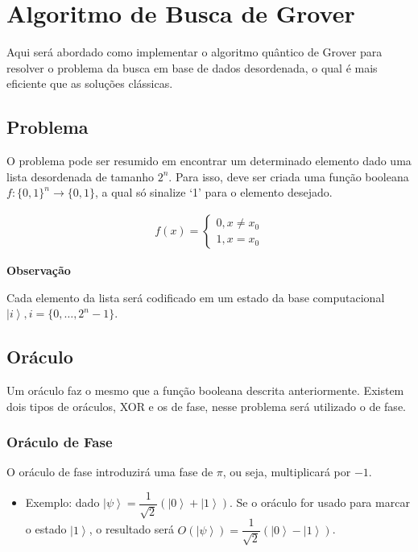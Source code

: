 \section{Algoritmo de Busca de Grover}\label{sec:algoritmo-de-busca-de-grover}

Aqui será abordado como implementar o algoritmo quântico de Grover para
resolver o problema da busca em base de dados desordenada, o qual é mais
eficiente que as soluções clássicas.

\subsection{Problema}\label{subsec:problema}

O problema pode ser resumido em encontrar um determinado elemento dado
uma lista desordenada de tamanho \(2^n\).
Para isso, deve ser criada uma função booleana \(f: \{0, 1\}^n \to \{0, 1\}\), a qual só sinalize `1'
para o elemento desejado.

\[\begin{aligned}
f(x) =  \begin{cases}
            0, x \ne x_0 \\
            1, x = x_0
        \end{cases}
\end{aligned}\]

\textbf{Observação}

Cada elemento da lista será codificado em um estado da base
computacional \(\left| i \right\rangle, i = \{0, \dots, 2^n - 1\}\).

\subsection{Oráculo}\label{subsec:oraculo}

Um oráculo faz o mesmo que a função booleana descrita anteriormente.
Existem dois tipos de oráculos, XOR e os de fase, nesse problema será
utilizado o de fase.

\subsubsection{Oráculo de Fase}\label{subsubsec:oraculo-de-fase}

O oráculo de fase introduzirá uma fase de \(\pi\), ou seja, multiplicará
por \(-1\).

\begin{itemize}
\tightlist
\item
  Exemplo: dado
  \(\left| \psi \right\rangle = \dfrac{1}{\sqrt{2}}\left( \left| 0 \right\rangle + \left| 1 \right\rangle\right)\).
  Se o oráculo for usado para marcar o estado
  \(\left| 1 \right\rangle\), o resultado será
  \(O(\left| \psi \right\rangle) = \dfrac{1}{\sqrt{2}}\left( \left| 0 \right\rangle - \left| 1 \right\rangle\right)\).
\end{itemize}

